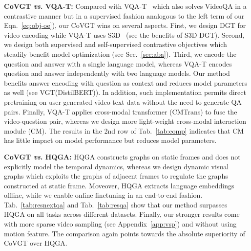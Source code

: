 \documentclass[10pt,journal,compsoc]{IEEEtran}
\newcommand{\vs}{\textit{vs}. }
\begin{document}
\textbf{CoVGT \vs VQA-T:}
Compared with VQA-T~\cite{yang2021just} which also solves VideoQA in a contrastive manner but in a supervised fashion analogous to the left term of our Eqn.~\eqref{eq:obj-oe}), our CoVGT wins on several aspects. First, we design DGT for video encoding while VQA-T uses S3D~\cite{xie2018rethinking,miech2020end} (see the benefits of S3D  DGT). Second, we design both supervised and self-supervised contrastive objectives which steadily benefit model optimization (see Sec.~\ref{sec:aba}). Third, we encode the question and answer with a single language model, whereas VQA-T encodes question and answer independently with two language models. Our method benefits answer encoding with question as context and reduces model parameters as well (see VGT(DistilBERT)). In addition, such implementation 
permits direct pretraining on user-generated video-text data without the need to generate QA pairs. Finally, VQA-T applies cross-modal transformer (CMTrans) to fuse the video-question pair, whereas we design more light-weight cross-modal interaction module (CM). The results in the 2nd row of Tab.~\ref{tab:comp} indicates that CM has little impact on model performance but reduces model parameters.
\setlength{\tabcolsep}{7pt}
\begin{table}[t!]
    \small
    \centering
    \caption{Detailed comparison between VGT and VQA-T~\cite{Yang_2021_ICCV}. CMTrans: cross-modal transformer.
    }
    \vspace{-0.5em}
    \vspace{-0.4cm}
    \label{tab:comp}
\end{table}

\textbf{CoVGT \vs HQGA:} HQGA \cite{xiao2022video} constructs graphs on static frames and does not explicitly model the temporal dynamics, whereas we design dynamic visual graphs which exploits the graphs of adjacent frames to regulate the graphs constructed at static frame. Moveover, HQGA extracts language embeddings offline, while we enable online finetuning in an end-to-end fashion. Tab.~\ref{tab:resnextqa} and Tab.~\ref{tab:resqa} show that our method surpasses HQGA on all tasks across different datasets. 
Finally, our stronger results come with more sparse video sampling (see Appendix~\ref{app:vsp}) and without using motion feature. The comparison again points towards the absolute superiority of CoVGT over HQGA.
\end{document}
